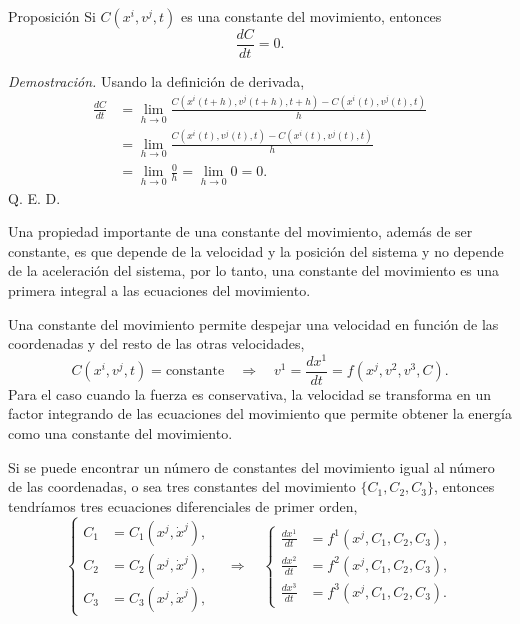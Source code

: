\documentclass[../apunte_mecanica_clasica.tex]{subfiles}%
\begin{document}
\begin{apuntebloque}{Proposición}
Si $C(x^i,v^j,t)$ es una constante del movimiento, entonces
\begin{equation*}
    \frac{dC}{dt}=0.
\end{equation*}
\end{apuntebloque}

\emph{Demostración.} Usando la definición de derivada,
\begin{align*}
    \frac{dC}{dt}
    &=\lim_{h\to 0}\frac{C(x^i(t+h),v^j(t+h),t+h)-C(x^i(t),v^j(t),t)}{h} \\
    &=\lim_{h\to 0}\frac{C(x^i(t),v^j(t),t)-C(x^i(t),v^j(t),t)}{h} \\
    &=\lim_{h\to 0}\frac{0}{h}
      =\lim_{h\to 0}0=0.
\end{align*}
Q. E. D.

Una propiedad importante de una constante del movimiento, además de ser constante, es que depende de la velocidad y la posición del sistema y no depende de la aceleración del sistema, por lo tanto, una constante del movimiento es una primera integral a las ecuaciones del movimiento.

Una constante del movimiento permite despejar una velocidad en función de las coordenadas y del resto de las otras velocidades,
\begin{equation*}
    C(x^i,v^j,t)=\text{constante}\quad\Longrightarrow\quad
    v^1=\frac{dx^1}{dt}=f(x^j,v^2,v^3,C).
\end{equation*}
Para el caso cuando la fuerza es conservativa, la velocidad se transforma en un factor integrando de las ecuaciones del movimiento que permite obtener la energía como una constante del movimiento.

Si se puede encontrar un número de constantes del movimiento igual al número de las coordenadas, o sea tres constantes del movimiento $\{C_1,C_2,C_3\}$, entonces tendríamos tres ecuaciones diferenciales de primer orden,
\begin{equation*}
\left\{
\begin{aligned}
    C_1&=C_1(x^j,\dot x^j),\\
    C_2&=C_2(x^j,\dot x^j),\\
    C_3&=C_3(x^j,\dot x^j),
\end{aligned}
\right.
\quad\Longrightarrow\quad
\left\{
\begin{aligned}
    \frac{dx^1}{dt}&=f^1(x^j,C_1,C_2,C_3),\\
    \frac{dx^2}{dt}&=f^2(x^j,C_1,C_2,C_3),\\
    \frac{dx^3}{dt}&=f^3(x^j,C_1,C_2,C_3).
\end{aligned}
\right.
\end{equation*}
\end{document}
